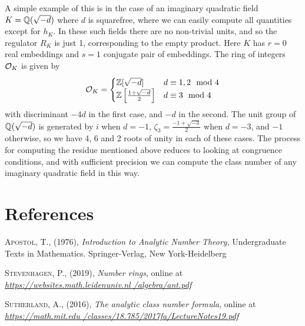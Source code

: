 \documentclass[11pt]{report}
\begin{document}
A simple example of this is in the case of an imaginary quadratic field $K = \Q(\sqrt{-d})$ where $d$ is squarefree, where we can easily compute all quantities except for $h_K$. In these such fields there are no non-trivial units, and so the regulator $R_K$ is just 1, corresponding to the empty product. Here $K$ has $r = 0$ real embeddings and $s = 1$ conjugate pair of embeddings. The ring of integers $\o_K$ is given by
\begin{align*}
    \o_K = \begin{cases}
        \Z[\sqrt{-d}] &d \equiv 1, 2 \mod 4 \\
        \Z\lr[]{\frac{1 + \sqrt{-d}}{2}} &d\equiv 3 \mod 4
    \end{cases}
\end{align*}
with discriminant $-4d$ in the first case, and $-d$ in the second. The unit group of $\Q(\sqrt{-d})$ is generated by $i$ when $d = -1$, $\zeta_3 = \frac{-1 + \sqrt{-3}}{2}$ when $d = -3$, and $-1$ otherwise, so we have 4, 6 and 2 roots of unity in each of these cases. The process for computing the residue mentioned above reduces to looking at congruence conditions, and with sufficient precision we can compute the class number of any imaginary quadratic field in this way.
\chapter{References}
\begin{enum}
    \item \hypertarget{apostol}{\textsc{Apostol, T.}, (1976), \emph{Introduction to Analytic Number Theory}, Undergraduate Texts in Mathematics. Springer-Verlag, New York-Heidelberg}
    \item \hypertarget{stevenhagen}{\textsc{Stevenhagen, P.}, (2019), \emph{Number rings}, online at \emph{\color{blue}\href{https://websites.math.leidenuniv.nl/algebra/ant.pdf}{https://websites.math.leidenuniv.nl /algebra/ant.pdf}\color{black}}}
    \item \hypertarget{sutherland}{\textsc{Sutherland, A.}, (2016), \emph{The analytic class number formula}, online at \emph{\color{blue}\href{https://math.mit.edu/classes/18.785/2017fa/LectureNotes19.pdf}{https://math.mit.edu /classes/18.785/2017fa/LectureNotes19.pdf}\color{black}}}
\end{enum}



\end{document}

